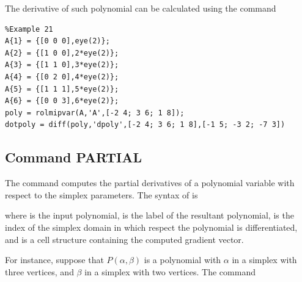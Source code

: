\documentclass[english,11pt]{article}
\theoremstyle{break} \theorembodyfont{\small\rm}
\begin{document}
The derivative of such polynomial can be calculated using the command

\vspace{0.5cm}%
\begin{minipage}{14.5cm}
\end{minipage}

\begin{minipage}{15.5cm}
 \begin{lstlisting}
%Example 21
A{1} = {[0 0 0],eye(2)};
A{2} = {[1 0 0],2*eye(2)};
A{3} = {[1 1 0],3*eye(2)};
A{4} = {[0 2 0],4*eye(2)};
A{5} = {[1 1 1],5*eye(2)};
A{6} = {[0 0 3],6*eye(2)};
poly = rolmipvar(A,'A',[-2 4; 3 6; 1 8]);
dotpoly = diff(poly,'dpoly',[-2 4; 3 6; 1 8],[-1 5; -3 2; -7 3])
 \end{lstlisting}
\end{minipage}
\vspace{0.2cm}

\subsection*{Command PARTIAL}

The command  computes the partial derivatives of a polynomial variable with respect 
to the simplex parameters. The syntax of  is

\vspace{0.5cm}%
\begin{minipage}{9.5cm}
\end{minipage}
\vspace{0.2cm}

\noindent where  is the input polynomial,  is the label of the 
resultant polynomial,  is the index of the simplex domain in which respect the polynomial
is differentiated, and  is a cell structure containing the computed gradient vector.

For instance, suppose that $P(\alpha,\beta)$ is a polynomial with $\alpha$
in a simplex with three vertices, and $\beta$ in a simplex with two vertices. The command

\vspace{0.5cm}%
\begin{minipage}{14.5cm}
\end{minipage}
\vspace{0.2cm}
\end{document}
